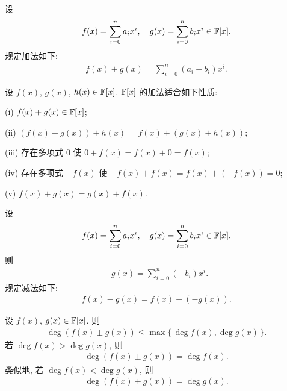 \begin{definition}
    设
    \begin{align*}
        f(x) = \sum_{i=0}^n a_i x^i, \quad g(x) = \sum_{i=0}^n b_i x^i \in \mathbb{F}[x].
    \end{align*}
    规定加法如下:
    \begin{align*}
        f(x) + g(x) = \sum_{i=0}^n (a_i + b_i) x^i.
    \end{align*}
\end{definition}

\begin{proposition}
    设 $f(x)$, $g(x)$, $h(x) \in \mathbb{F}[x]$. $\mathbb{F}[x]$ 的加法适合如下性质:

    (i) $f(x) + g(x) \in \mathbb{F}[x]$;

    (ii) $(f(x) + g(x)) + h(x)$ = $f(x) + (g(x) + h(x))$;

    (iii) 存在多项式 $0$ 使 $0 + f(x) = f(x) + 0 = f(x)$;

    (iv) 存在多项式 $-f(x)$ 使 $-f(x) + f(x) = f(x) + (-f(x)) = 0$;

    (v) $f(x) + g(x) = g(x) + f(x)$.
\end{proposition}

\begin{definition}
    设
    \begin{align*}
        f(x) = \sum_{i=0}^n a_i x^i, \quad g(x) = \sum_{i=0}^n b_i x^i \in \mathbb{F}[x].
    \end{align*}
    则
    \begin{align*}
        -g(x) = \sum_{i=0}^n (-b_i) x^i.
    \end{align*}
    规定减法如下:
    \begin{align*}
        f(x) - g(x) = f(x) + (-g(x)).
    \end{align*}
\end{definition}

\begin{proposition}
    设 $f(x)$, $g(x) \in \mathbb{F}[x]$. 则
    \begin{align*}
        \deg (f(x) \pm g(x)) \leq \max \{\, \deg f(x), \deg g(x) \,\}.
    \end{align*}
    若 $\deg f(x) > \deg g(x)$, 则
    \begin{align*}
        \deg (f(x) \pm g(x)) = \deg f(x).
    \end{align*}
    类似地, 若 $\deg f(x) < \deg g(x)$, 则
    \begin{align*}
        \deg (f(x) \pm g(x)) = \deg g(x).
    \end{align*}
\end{proposition}

